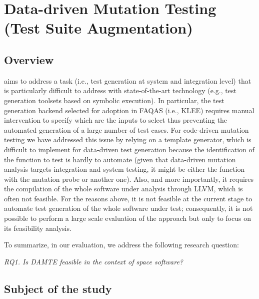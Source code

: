 \clearpage
\section{Data-driven Mutation Testing (Test Suite Augmentation)}
\label{sec:testGeneration:dataDriven}

\STARTCHANGEDFINAL

\subsection{Overview}

\DAMTE aims to address a task (i.e., test generation at system and integration level) that is particularly difficult to address with state-of-the-art technology (e.g., test generation toolsets based on symbolic execution). In particular, the test generation backend selected for adoption in FAQAS (i.e., KLEE) requires manual intervention to specify which are the inputs to select thus preventing the automated generation of a large number of test cases. For code-driven mutation testing we have addressed this issue by relying on a template generator, which is difficult to implement for data-driven test generation because the identification of the function to test is hardly to automate (given that data-driven mutation analysis targets integration and system testing, it might be either the function with the mutation probe or another one). Also, and more importantly, it requires the compilation of the whole software under analysis through LLVM, which is often not feasible. For the reasons above, it is not feasible at the current stage to automate test generation of the whole software under test; consequently,
it is not possible to perform a large scale evaluation of the approach but only to focus on its feasibility analysis.

To summarize, in our evaluation, we address the following research question:

\emph{RQ1. Is DAMTE feasible in the context of space software?}



\subsection{Subject of the study}

